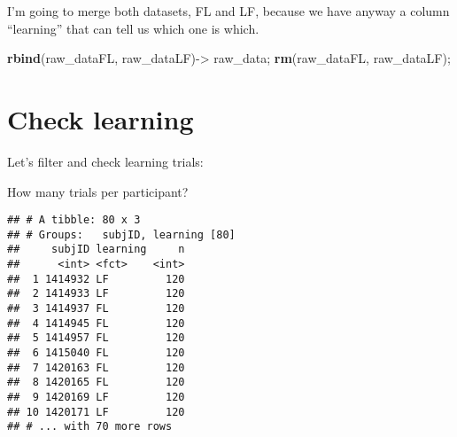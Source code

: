 \documentclass[
]{article}
\newenvironment{Shaded}{\begin{snugshade}}{\end{snugshade}}
\newcommand{\KeywordTok}[1]{\textcolor[rgb]{0.13,0.29,0.53}{\textbf{#1}}}
\newcommand{\NormalTok}[1]{#1}
\newcommand{\OperatorTok}[1]{\textcolor[rgb]{0.81,0.36,0.00}{\textbf{#1}}}
\newcommand{\StringTok}[1]{\textcolor[rgb]{0.31,0.60,0.02}{#1}}
\begin{document}
I'm going to merge both datasets, FL and LF, because we have anyway a
column ``learning'' that can tell us which one is which.

\begin{Shaded}
\begin{Highlighting}[]
\KeywordTok{rbind}\NormalTok{(raw_dataFL, raw_dataLF)->}\StringTok{ }\NormalTok{raw_data; }
\KeywordTok{rm}\NormalTok{(raw_dataFL, raw_dataLF);}
\end{Highlighting}
\end{Shaded}

\hypertarget{check-learning}{%
\section{Check learning}\label{check-learning}}

Let's filter and check learning trials:

\begin{Shaded}
\end{Shaded}

How many trials per participant?

\begin{Shaded}
\end{Shaded}

\begin{verbatim}
## # A tibble: 80 x 3
## # Groups:   subjID, learning [80]
##     subjID learning     n
##      <int> <fct>    <int>
##  1 1414932 LF         120
##  2 1414933 LF         120
##  3 1414937 FL         120
##  4 1414945 FL         120
##  5 1414957 FL         120
##  6 1415040 FL         120
##  7 1420163 FL         120
##  8 1420165 FL         120
##  9 1420169 LF         120
## 10 1420171 LF         120
## # ... with 70 more rows
\end{verbatim}
\end{document}
